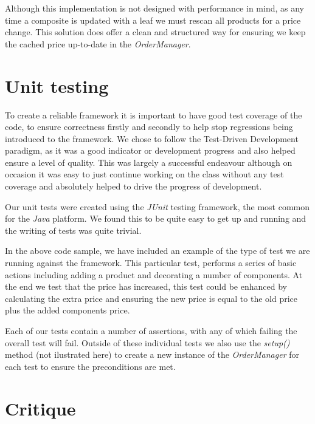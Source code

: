 \documentclass[pdftex,11pt,a4paper]{article}
\begin{document}
Although this implementation is not designed with performance in mind, as any time a composite is updated with a leaf we must rescan all products for a price change. This solution does offer a clean and structured way for ensuring we keep the cached price up-to-date in the \emph{OrderManager}.

\pagebreak

\section{Unit testing}

To create a reliable framework it is important to have good test coverage of the code, to ensure correctness firstly and secondly to help stop regressions being introduced to the framework. We chose to follow the Test-Driven Development paradigm, as it was a good indicator or development progress and also helped ensure a level of quality. This was largely a successful endeavour although on occasion it was easy to just continue working on the class without any test coverage and absolutely helped to drive the progress of development.

Our unit tests were created using the \emph{JUnit} testing framework\cite{website:junit}, the most common for the \emph{Java} platform. We found this to be quite easy to get up and running and the writing of tests was quite trivial.



In the above code sample, we have included an example of the type of test we are running against the framework. This particular test, performs a series of basic actions including adding a product and decorating a number of components. At the end we test that the price has increased, this test could be enhanced by calculating the extra price and ensuring the new price is equal to the old price plus the added components price.

Each of our tests contain a number of assertions, with any of which failing the overall test will fail. Outside of these individual tests we also use the \emph{setup()} method (not ilustrated here) to create a new instance of the \emph{OrderManager} for each test to ensure the preconditions are met.
\pagebreak


\section{Critique}
\end{document}

